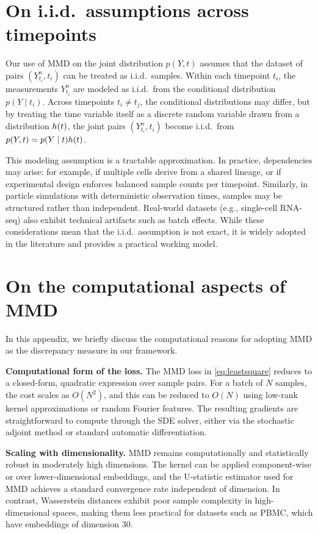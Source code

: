 \section{On i.i.d.\ assumptions across timepoints}
\label{app:iid-assumptions}

Our use of MMD on the joint distribution $p(Y, t)$ assumes that the dataset of pairs $(Y^n_{t_i}, t_i)$ can be treated as i.i.d.\ samples. 
Within each timepoint $t_i$, the measurements $Y^n_{t_i}$ are modeled as i.i.d.\ from the conditional distribution $p(Y \mid t_i)$. 
Across timepoints $t_i \neq t_j$, the conditional distributions may differ, but by treating the time variable itself as a discrete random variable drawn from a distribution $h(t)$, the joint pairs $(Y^n_{t_i}, t_i)$ become i.i.d.\ from $p(Y, t) = p(Y \mid t)h(t)$. 

This modeling assumption is a tractable approximation. In practice, dependencies may arise: for example, if multiple cells derive from a shared lineage, or if experimental design enforces balanced sample counts per timepoint. Similarly, in particle simulations with deterministic observation times, samples may be structured rather than independent. Real-world datasets (e.g., single-cell RNA-seq) also exhibit technical artifacts such as batch effects. While these considerations mean that the i.i.d.\ assumption is not exact, it is widely adopted in the literature and provides a practical working model. 

\section{On the computational aspects of MMD}
\label{app:mmd-computation}
In this appendix, we briefly discuss the computational reasons for adopting MMD as the discrepancy measure in our framework.

\textbf{Computational form of the loss.} The MMD loss in \cref{eq:leastsquare} reduces to a closed-form, quadratic expression over sample pairs. For a batch of $N$ samples, the cost scales as $O(N^2)$, and this can be reduced to $O(N)$ using low-rank kernel approximations or random Fourier features. The resulting gradients are straightforward to compute through the SDE solver, either via the stochastic adjoint method or standard automatic differentiation.

\textbf{Scaling with dimensionality.} MMD remains computationally and statistically robust in moderately high dimensions. The kernel can be applied component-wise or over lower-dimensional embeddings, and the U-statistic estimator used for MMD achieves a standard convergence rate independent of dimension. In contrast, Wasserstein distances exhibit poor sample complexity in high-dimensional spaces, making them less practical for datasets such as PBMC, which have embeddings of dimension $30$.

